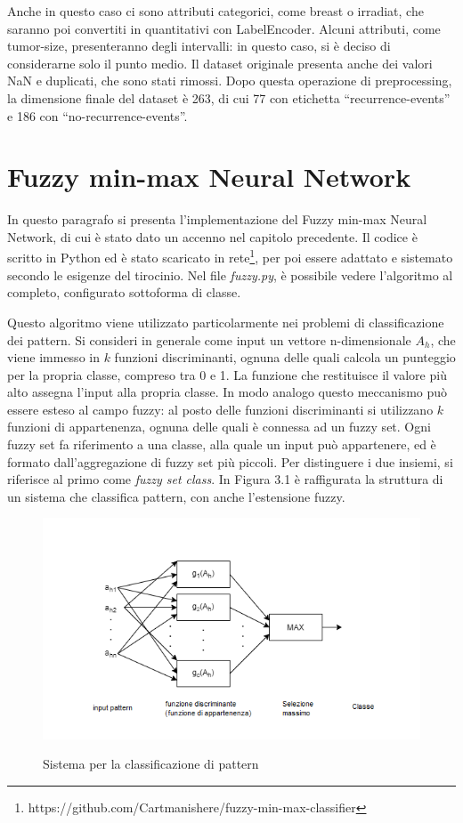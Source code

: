 \documentclass[11pt,  oneside, openany]{book}
\begin{document}
Anche in questo caso ci sono attributi categorici, come breast o irradiat, che saranno poi convertiti in quantitativi con LabelEncoder. Alcuni attributi, come tumor-size, presenteranno degli intervalli: in questo caso, si è deciso di considerarne solo il punto medio. Il dataset originale presenta anche dei valori NaN e duplicati, che sono stati rimossi. Dopo questa operazione di preprocessing, la dimensione finale del dataset  è 263, di cui 77 con etichetta ``recurrence-events'' e 186 con ``no-recurrence-events''. 


	\section{Fuzzy min-max Neural Network}
In questo paragrafo si presenta l'implementazione del Fuzzy min-max Neural Network, di cui è stato dato un accenno nel capitolo precedente. Il codice è scritto in Python ed è stato scaricato in rete\footnote{https://github.com/Cartmanishere/fuzzy-min-max-classifier}, per poi essere adattato e sistemato secondo le esigenze del tirocinio. Nel file \textit{fuzzy.py}, è possibile vedere l'algoritmo al completo, configurato sottoforma di classe. 

Questo algoritmo viene utilizzato particolarmente nei problemi di classificazione dei pattern. Si consideri in generale come input un vettore n-dimensionale $A_h$, che viene immesso in $k$ funzioni discriminanti, ognuna delle quali calcola un punteggio per la propria classe, compreso tra 0 e 1. La funzione che restituisce il valore più alto assegna l'input alla propria classe. In modo analogo questo meccanismo può essere esteso al campo fuzzy: al posto delle funzioni discriminanti si utilizzano $k$ funzioni di appartenenza, ognuna delle quali è connessa ad un fuzzy set. Ogni fuzzy set fa riferimento a una classe, alla quale un input può appartenere, ed è formato dall'aggregazione di fuzzy set più piccoli. Per distinguere i due insiemi, si riferisce al primo come \textit{fuzzy set class}. In Figura 3.1 è raffigurata la struttura di un sistema che classifica pattern, con anche l'estensione fuzzy. 

\begin{figure}[h!]
\begin{center}
  \includegraphics[width=12cm]{Immagini/FMMNN_nn.png}\\
  \caption{Sistema per la classificazione di pattern}
\end{center}
\end{figure}
\end{document}
